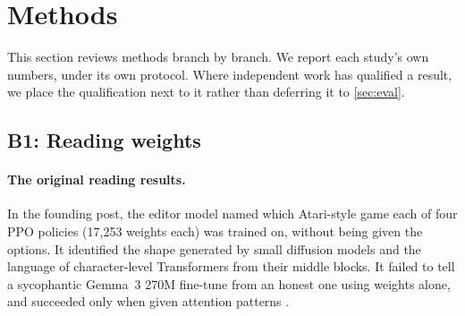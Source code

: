 \section{Methods}
\label{sec:methods}

This section reviews methods branch by branch. We report each study's own numbers, under its own protocol. Where independent work has qualified a result, we place the qualification next to it rather than deferring it to \cref{sec:eval}.

\subsection{B1: Reading weights}
\label{sec:read}

\paragraph{The original reading results.} In the founding post, the editor model named which Atari-style game each of four PPO policies (17{,}253 weights each) was trained on, without being given the options. It identified the shape generated by small diffusion models and the language of character-level Transformers from their middle blocks. It failed to tell a sycophantic Gemma~3 270M fine-tune from an honest one using weights alone, and succeeded only when given attention patterns \citep{takehi2026sparks}.

